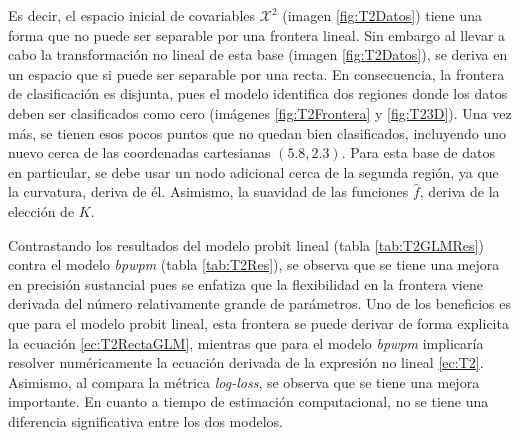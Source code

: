 \documentclass[../Main/Main.tex]{subfiles}
\begin{document}
Es decir, el espacio inicial de covariables $\mathcal{X}^2$ (imagen \ref{fig:T2Datos}) tiene una forma que no puede ser separable por una frontera lineal. Sin embargo al llevar a cabo la transformación no lineal de esta base (imagen \ref{fig:T2Datos}), se deriva en un espacio que si puede ser separable por una recta. En consecuencia, la frontera de clasificación es disjunta, pues el modelo identifica dos regiones donde los datos deben ser clasificados como cero (imágenes \ref{fig:T2Frontera} y \ref{fig:T23D}). Una vez más, se tienen esos pocos puntos que no quedan bien clasificados, incluyendo uno nuevo cerca de las coordenadas cartesianas $(5.8, 2.3)$. Para esta base de datos en particular, se debe usar un nodo adicional cerca de la segunda región, ya que la curvatura, deriva de él. Asimismo, la suavidad de las funciones $\hat{f}$, deriva de la elección de $K$.

Contrastando los resultados del modelo probit lineal (tabla \ref{tab:T2GLMRes}) contra el modelo \textit{bpwpm} (tabla \ref{tab:T2Res}), se observa que se tiene una mejora en precisión sustancial pues se enfatiza que la flexibilidad en la frontera viene derivada del número relativamente grande de parámetros. Uno de los beneficios es que para el modelo probit lineal, esta frontera se puede derivar de forma explicita la ecuación \eqref{ec:T2RectaGLM}, mientras que para el modelo \textit{bpwpm} implicaría resolver numéricamente la ecuación derivada  de la expresión no lineal \eqref{ec:T2}. Asimismo, al compara la métrica \textit{log-loss}, se observa que se tiene una mejora importante. En cuanto a tiempo de estimación computacional, no se tiene una diferencia significativa entre los dos modelos. 
\end{document}
